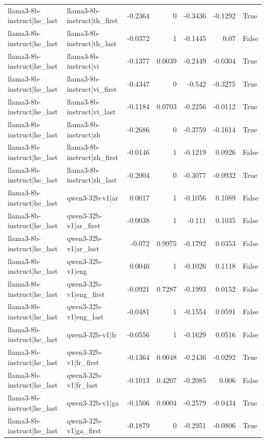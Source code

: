 \begin{table}
\begin{tabular}{l l r r r r l}
llama3-8b-instruct|he_last & llama3-8b-instruct|th_first & -0.2364 & 0 & -0.3436 & -0.1292 & True \\
llama3-8b-instruct|he_last & llama3-8b-instruct|th_last & -0.0372 & 1 & -0.1445 & 0.07 & False \\
llama3-8b-instruct|he_last & llama3-8b-instruct|vi & -0.1377 & 0.0039 & -0.2449 & -0.0304 & True \\
llama3-8b-instruct|he_last & llama3-8b-instruct|vi_first & -0.4347 & 0 & -0.542 & -0.3275 & True \\
llama3-8b-instruct|he_last & llama3-8b-instruct|vi_last & -0.1184 & 0.0703 & -0.2256 & -0.0112 & True \\
llama3-8b-instruct|he_last & llama3-8b-instruct|zh & -0.2686 & 0 & -0.3759 & -0.1614 & True \\
llama3-8b-instruct|he_last & llama3-8b-instruct|zh_first & -0.0146 & 1 & -0.1219 & 0.0926 & False \\
llama3-8b-instruct|he_last & llama3-8b-instruct|zh_last & -0.2004 & 0 & -0.3077 & -0.0932 & True \\
llama3-8b-instruct|he_last & qwen3-32b-v1|ar & 0.0017 & 1 & -0.1056 & 0.1089 & False \\
llama3-8b-instruct|he_last & qwen3-32b-v1|ar_first & -0.0038 & 1 & -0.111 & 0.1035 & False \\
llama3-8b-instruct|he_last & qwen3-32b-v1|ar_last & -0.072 & 0.9975 & -0.1792 & 0.0353 & False \\
llama3-8b-instruct|he_last & qwen3-32b-v1|eng & 0.0046 & 1 & -0.1026 & 0.1118 & False \\
llama3-8b-instruct|he_last & qwen3-32b-v1|eng_first & -0.0921 & 0.7287 & -0.1993 & 0.0152 & False \\
llama3-8b-instruct|he_last & qwen3-32b-v1|eng_last & -0.0481 & 1 & -0.1554 & 0.0591 & False \\
llama3-8b-instruct|he_last & qwen3-32b-v1|fr & -0.0556 & 1 & -0.1629 & 0.0516 & False \\
llama3-8b-instruct|he_last & qwen3-32b-v1|fr_first & -0.1364 & 0.0048 & -0.2436 & -0.0292 & True \\
llama3-8b-instruct|he_last & qwen3-32b-v1|fr_last & -0.1013 & 0.4207 & -0.2085 & 0.006 & False \\
llama3-8b-instruct|he_last & qwen3-32b-v1|ga & -0.1506 & 0.0004 & -0.2579 & -0.0434 & True \\
llama3-8b-instruct|he_last & qwen3-32b-v1|ga_first & -0.1879 & 0 & -0.2951 & -0.0806 & True \\

\end{tabular}
\end{table}
